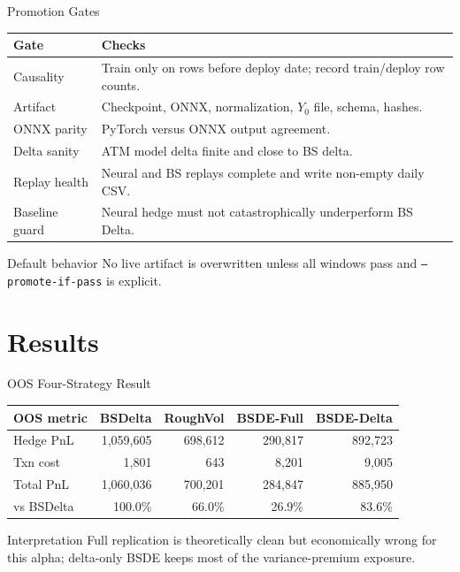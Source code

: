 \documentclass[11pt,aspectratio=169]{beamer}
\newcommand{\1}{\mathbf{1}}
\begin{document}
\begin{frame}{Promotion Gates}
    \small
    \begin{center}
    \renewcommand{\arraystretch}{1.18}
    \begin{tabular}{p{}p{}}
    \toprule
    \textbf{Gate} & \textbf{Checks} \\
    \midrule
    Causality & Train only on rows before deploy date; record train/deploy row counts. \\
    Artifact & Checkpoint, ONNX, normalization, $Y_0$ file, schema, hashes. \\
    ONNX parity & PyTorch versus ONNX output agreement. \\
    Delta sanity & ATM model delta finite and close to BS delta. \\
    Replay health & Neural and BS replays complete and write non-empty daily CSV. \\
    Baseline guard & Neural hedge must not catastrophically underperform BS Delta. \\
    \bottomrule
    \end{tabular}
    \end{center}
    \vspace{2pt}
    \begin{alertblock}{Default behavior}
    No live artifact is overwritten unless all windows pass and \texttt{--promote-if-pass} is explicit.
    \end{alertblock}
\end{frame}

\section{Results}

\begin{frame}{OOS Four-Strategy Result}
    \scriptsize
    \begin{center}
    \renewcommand{\arraystretch}{1.15}
    \begin{tabular}{lrrrr}
    \toprule
    \textbf{OOS metric} & \textbf{BSDelta} & \textbf{RoughVol} & \textbf{BSDE-Full} & \textbf{BSDE-Delta} \\
    \midrule
    Hedge PnL & 1,059,605 & 698,612 & 290,817 & 892,723 \\
    Txn cost & 1,801 & 643 & 8,201 & 9,005 \\
    Total PnL & 1,060,036 & 700,201 & 284,847 & 885,950 \\
    vs BSDelta & 100.0\% & 66.0\% & 26.9\% & 83.6\% \\
    \bottomrule
    \end{tabular}
    \end{center}
    \vspace{4pt}
    \begin{block}{Interpretation}
    Full replication is theoretically clean but economically wrong for this alpha; delta-only BSDE keeps most of the variance-premium exposure.
    \end{block}
\end{frame}
\end{document}
